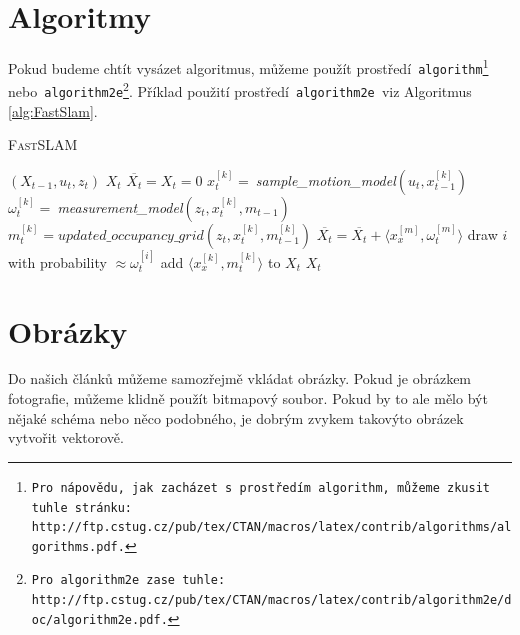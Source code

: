 \documentclass[a4paper,11pt,titlepage]{article}
\newcommand{\INDSTATE}[1][1]{\STATE\hspace{#1\algorithmicindent}}
\begin{document}
\newpage
\pagestyle{plain}
\section{Algoritmy} \label{sec:Algoritmy}
Pokud budeme chtít vysázet algoritmus, můžeme použít prostředí\texttt{ algorithm\footnote{Pro nápovědu, jak zacházet s prostředím\texttt{ algorithm,} můžeme zkusit tuhle 
stránku:\\http://ftp.cstug.cz/pub/tex/CTAN/macros/latex/contrib/algorithms/algorithms.pdf.} } 
nebo\texttt{ algorithm2e\footnote{Pro\texttt{ algorithm2e }zase tuhle: http://ftp.cstug.cz/pub/tex/CTAN/macros/latex/contrib/algorithm2e/doc/algorithm2e.pdf.}}.
Příklad použití prostředí\texttt{ algorithm2e }viz Algoritmus \ref{alg:FastSlam}.\\[2mm]

\medskip

\begin{algorithm}[H]
\caption{\textsc{FastSLAM}}
\label{alg:FastSlam}
    \begin{algorithmic}[1]
        \REQUIRE $(X_{t-1},u_t,z_t)$
        \ENSURE $X_t$
        \medskip
        \STATE $\overline{X_t} = X_t = 0$
            \INDSTATE $x^{[k]}_t=\:$\emph{sample\_motion\_model}$(u_t,x^{[k]}_{t-1})$
            \INDSTATE $\omega^{[k]}_t=\:$\emph{measurement\_model}$(z_t,x^{[k]}_t,m_{t-1})$
            \INDSTATE $m^{[k]}_t=updated\_occupancy\_grid(z_t,x^{[k]}_t,m^{[k]}_{t-1})$
            \INDSTATE $\overline{X_t}=\overline{X_t}+\langle x^{[m]}_x,\omega^{[m]}_t \rangle$
        \ENDFOR
            \INDSTATE draw $i$ with probability $\approx \omega^{[i]}_t$
            \INDSTATE add $\langle x^{[k]}_x,m^{[k]}_t \rangle$ to $X_t$
        \ENDFOR
        \RETURN $X_t$
    \end{algorithmic}
\end{algorithm}

\bigskip

\section{Obrázky}
Do našich článků můžeme samozřejmě vkládat obrázky. Pokud je obrázkem fotografie, můžeme klidně použít bitmapový soubor. Pokud by to ale mělo být nějaké schéma nebo něco podobného, je dobrým zvykem takovýto obrázek vytvořit vektorově.
\end{document}
